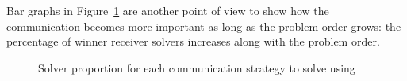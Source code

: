 Bar graphs in Figure~\ref{fig:boxplot_bar} are another point of view to show how the communication becomes more important as long as the problem order grows: the percentage of winner receiver solvers increases along with the problem order.

\begin{figure}[!h]
\centering
{} %
\caption[]{Solver proportion for each communication strategy to solve \GRP{} using \posl}
\label{fig:boxplot_bar}
\end{figure}

%
%
